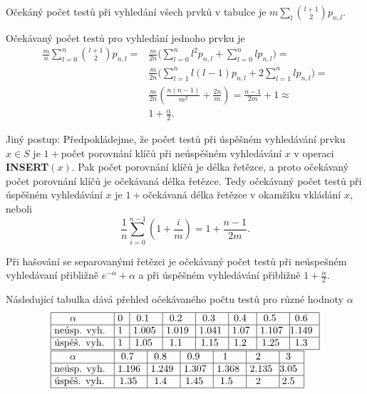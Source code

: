 \documentclass[a4paper,12pt]{article}
\begin{document}
Očekáný počet testů při vyhledání všech 
prvků v tabulce je $m\sum_l\binom {l+1}2p_{n,l}$.

Očekávaný počet testů pro 
vyhledání jednoho prvku je 
\begin{align*}\frac mn\sum_{l=0}^n\binom {l+1}2p_{n,l}=&\frac m{2n}\big
(\sum_{l=0}^nl^2p_{n,l}+\sum_{l=0}^nlp_{n,l}\big)=\\
&\frac m{2n}\big(\sum_{l=1}^nl(l-1)p_{n,l}+2\sum_{l=1}^nlp_{n,l}\big
)=\\
&\frac m{2n}(\frac {n(n-1)}{m^2}+\frac {2n}m)=\frac {n-1}{2m}+1\approx\\
&1+\frac {\alpha}2.\end{align*}

Jiný postup: Předpokládejme, že počet testů při úspěšném 
vyhledávání prvku $x\in S$ je $1+$počet porovnání 
klíčů při neúspěšném vyhledávání $
x$ v operaci 
{\bf INSERT$(x)$}. Pak počet porovnání klíčů je délka 
řetězce, a proto očekáva\-ný počet porovnání klíčů 
je očekáva\-ná délka řetězce. Tedy očekávaný počet 
testů při úspěšném vyhledávání $x$ je  
$1+$očekávaná délka řetězce v okamžiku vkládání $
x$, neboli 
$$\frac 1n\sum_{i=0}^{n-1}(1+\frac im)=1+\frac {n-1}{2m}.$$

\begin{veta}Při hašování se separovanými řetězci je 
očekávaný po\-čet testů při neúspeš\-ném 
vy\-hledávaní přibližně $e^{-\alpha}+\alpha$ a při ús\-pěš\-ném 
vyhledávání přibližně $1+\frac {\alpha}2$.
\end{veta}

Následující tabulka dává přehled očekávaného 
počtu testů pro různé hodnoty $\alpha$
$$\vtop{\hbox{\vbox {\offinterlineskip\halign{\strut\vrule\ # & \vrule\ # & \vrule\ # & \vrule\ # & \vrule\ # & \vrule\ # & \vrule\ # & \vrule\hfill # \hfill \vrule\cr\noalign{\hrule} $
\alpha$ & 0 & 0.1 & 0.2 & 0.3 & 0.4 & 0.5 & 0.6 \cr\noalign{\hrule}neúsp. vyh. & 1 & 1.005 & 1.019 & 1.041 & 1.07 & 1.107 & 1.149 \cr\noalign{\hrule} úspěš. vyh. & 1 & 1.05 & 1.1 & 1.15 & 1.2 & 1.25 & 1.3 \cr\noalign{\hrule}}}}\hbox{\vbox {\offinterlineskip\halign{\strut\vrule\ # & \vrule\ # & \vrule\ # & \vrule\ # & \vrule\ # & \vrule\ # & \vrule\hfill # \hfill \vrule\cr\noalign{\hrule} $
\alpha$ & 0.7 & 0.8 & 0.9 & 1 & 2 & 3 \cr\noalign{\hrule}neúsp. vyh. & 1.196 & 1.249 & 1.307 & 1.368 & 2.135 & 3.05 \cr\noalign{\hrule}úspěš. vyh. & 1.35 & 1.4 & 1.45 & 1.5 & 2 & 2.5 \cr\noalign{\hrule}}}}}$$
\end{document}
